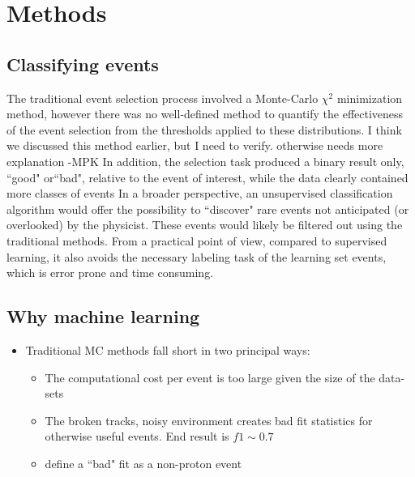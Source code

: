 \documentclass[review,number,sort&compress]{elsarticle}
\begin{document}
\section{Methods}\label{sec:methods}

\subsection{Classifying  events} 
The traditional event selection process involved a Monte-Carlo $\chi^2$ minimization method, however there was no well-defined method to quantify the effectiveness of the event selection from the thresholds applied to these distributions.
{\color{blue} I think we discussed this method earlier, but I need to verify. otherwise needs more explanation -MPK}
In addition, the selection task produced a binary result only, ``good" or``bad", relative to the event of interest, while the data clearly contained more classes of events%
In a broader perspective, an unsupervised classification algorithm would offer the possibility to ``discover" rare events not anticipated (or overlooked) by the physicist. These events would likely be filtered out using the traditional methods. From a practical point of view, compared to supervised learning, it also avoids the necessary labeling task of the learning set events, which is error prone and time consuming.

\subsection{Why machine learning}

\begin{itemize}
    \item Traditional MC methods fall short in two principal ways:
    \begin{itemize}
        \item The computational cost per event is too large given the size of the data-sets
        \item The broken tracks, noisy environment creates bad fit statistics for otherwise useful events. End result is $f1 \sim 0.7 $
        \item define a ``bad" fit as a non-proton event
    \end{itemize}
\end{itemize}
\end{document}
